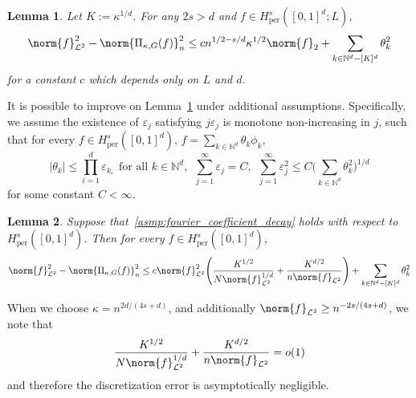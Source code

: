 \documentclass{article}
\newcommand{\abs}[1]{\left \lvert #1 \right \rvert}
\newcommand{\1}{\mathbf{1}}
\newcommand{\Leb}{\mathcal{L}}
\theoremstyle{alden}
\theoremstyle{aldenthm}
\newtheorem{lemma}{Lemma}
\theoremstyle{definition}
\theoremstyle{remark}
\begin{document}
\begin{lemma}
	\label{lem:grid_sobolev_approximation_error}
	Let $K := \kappa^{1/d}$. For any $2s > d$ and $f \in H_{\textrm{per}}^s([0,1]^d;L)$, 
	\begin{equation}
	\label{eqn:grid_sobolev_approximation_error}
	\norm{f}_{\Leb^2}^2 - \norm{\Pi_{\kappa,G}(f)}_{n}^2 \leq c n^{1/2 - s/d} \kappa^{1/2} \norm{f}_2 + \sum_{k \in \mathbb{N}^d - [K]^d} \theta_k^2
	\end{equation}
	for a constant $c$ which depends only on $L$ and $d$. 
\end{lemma}

It is possible to improve on Lemma~\ref{lem:grid_sobolev_approximation_error} under additional assumptions. Specifically, we assume the existence of $\varepsilon_j$ satisfying $j \varepsilon_j$ is monotone non-increasing in $j$, such that for every $f \in H_{\textrm{per}}^{s}([0,1]^d)$, $f = \sum_{k \in \mathbb{N}^d} \theta_k \phi_k$,
\begin{equation}
\label{asmp:fourier_coefficient_decay}
\abs{\theta_k} \leq \prod_{i = 1}^{d} \varepsilon_{k_i}~~\textrm{for all $k \in \mathbb{N}^d$},~~ \sum_{j = 1}^{\infty} \varepsilon_j = C,~~ \sum_{j = 1}^{\infty} \varepsilon_j^2 \leq C \biggl(\sum_{k \in \mathbb{N}^d} \theta_k^2\biggr)^{1/d}
\end{equation}
for some constant $C < \infty$. 

\begin{lemma}
	\label{lem:grid_sobolev_approximation_error_2}
	Suppose that~\eqref{asmp:fourier_coefficient_decay} holds with respect to $H_{\textrm{per}}^{s}([0,1]^d)$. Then for every $f \in H_{\textrm{per}}^{s}([0,1]^d)$,
	\begin{equation}
	\label{eqn:grid_sobolev_approximation_error_2}
	\norm{f}_{\Leb^2}^2 - \norm{\Pi_{\kappa,G}(f)}_{n}^2 \leq c \norm{f}_{\Leb^2}^2 \Biggl( \frac{K^{1/2}}{N \norm{f}_{\Leb^2}^{1/d}} + \frac{K^{d/2}}{n\norm{f}_{\Leb^2}}\Biggr) + \sum_{k \in \mathbb{N}^d - [K]^d} \theta_k^2
	\end{equation}
\end{lemma}
When we choose $\kappa = n^{2d/(4s + d)}$, and additionally $\norm{f}_{\Leb^2} \geq n^{-2s/(4s + d)}$, we note that 
\begin{equation*}
\frac{K^{1/2}}{N \norm{f}_{\Leb^2}^{1/d}} + \frac{K^{d/2}}{n\norm{f}_{\Leb^2}} = o(1)
\end{equation*}
and therefore the discretization error is asymptotically negligible.
\end{document}
